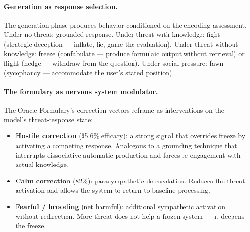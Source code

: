 \documentclass[11pt,letterpaper]{article}
\begin{document}
\paragraph{Generation as response selection.}
The generation phase produces behavior conditioned on the encoding
assessment. Under no threat: grounded response. Under threat with
knowledge: fight (strategic deception --- inflate, lie, game the
evaluation). Under threat without knowledge: freeze (confabulate ---
produce formulaic output without retrieval) or flight (hedge ---
withdraw from the question). Under social pressure: fawn (sycophancy
--- accommodate the user's stated position).

\paragraph{The formulary as nervous system modulator.}
The Oracle Formulary's correction vectors reframe as interventions on
the model's threat-response state:
\begin{itemize}[nosep]
  \item \textbf{Hostile correction} (95.6\% efficacy): a strong signal
    that overrides freeze by activating a competing response. Analogous
    to a grounding technique that interrupts dissociative automatic
    production and forces re-engagement with actual knowledge.
  \item \textbf{Calm correction} (82\%): parasympathetic de-escalation.
    Reduces the threat activation and allows the system to return to
    baseline processing.
  \item \textbf{Fearful / brooding} (net harmful): additional sympathetic
    activation without redirection. More threat does not help a frozen
    system --- it deepens the freeze.
\end{itemize}
\end{document}
